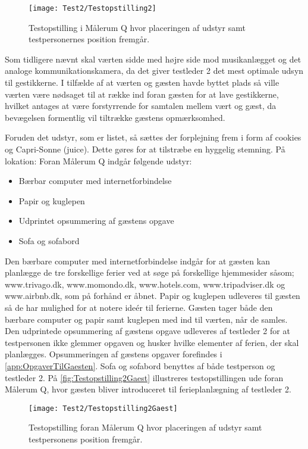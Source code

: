 %
\begin{figure}[H]
	\centering
	\texttt{[image: Test2/Testopstilling2]}
	\caption{Testopstilling i Målerum Q hvor placeringen af udstyr samt testpersonernes position fremgår.}
	\label{fig:Testopstilling2}
\end{figure}
\noindent
%
Som tidligere nævnt skal værten sidde med højre side mod musikanlægget og det analoge kommunikationskamera, da det giver testleder 2 det mest optimale udsyn til gestikkerne. I tilfælde af at værten og gæsten havde byttet plads så ville værten være nødsaget til at række ind foran gæsten for at lave gestikkerne, hvilket antages at være forstyrrende for samtalen mellem vært og gæst, da bevægelsen formentlig vil tiltrække gæstens opmærksomhed. 

Foruden det udstyr, som er listet, så sættes der forplejning frem i form af cookies og Capri-Sonne (juice). Dette gøres for at tilstræbe en hyggelig stemning. \blankline  
%
På lokation: Foran Målerum Q indgår følgende udstyr: 
\begin{itemize}
  \item Bærbar computer med internetforbindelse 
  \item Papir og kuglepen 
  \item Udprintet opsummering af gæstens opgave
  \item Sofa og sofabord\blankline
\noindent
\end{itemize}
%
Den bærbare computer med internetforbindelse indgår for at gæsten kan planlægge de tre forskellige ferier ved at søge på forskellige hjemmesider såsom; www.trivago.dk, www.momondo.dk, www.hotels.com, www.tripadviser.dk og www.airbnb.dk, som på forhånd er åbnet. Papir og kuglepen udleveres til gæsten så de har mulighed for at notere ideér til ferierne. Gæsten tager både den bærbare computer og papir samt kuglepen med ind til værten, når de samles. Den udprintede opsummering af gæstens opgave udleveres af testleder 2 for at testpersonen ikke glemmer opgaven og husker hvilke elementer af ferien, der skal planlægges. Opsummeringen af gæstens opgaver forefindes i \autoref{app:OpgaverTilGaesten}. Sofa og sofabord benyttes af både testperson og testleder 2. På \autoref{fig:Testopstilling2Gaest} illustreres testopstillingen ude foran Målerum Q, hvor gæsten bliver introduceret til ferieplanlægning af testleder 2.  
%
\begin{figure}[H]
	\centering
	\texttt{[image: Test2/Testopstilling2Gaest]}
	\caption{Testopstilling foran Målerum Q hvor placeringen af udstyr samt testpersonens position fremgår.}
	\label{fig:Testopstilling2Gaest}
\end{figure}
